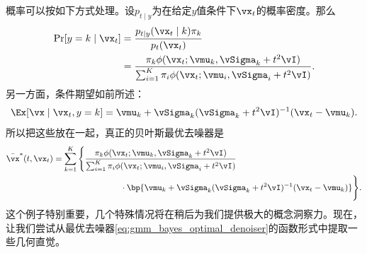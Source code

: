 \documentclass[../../book-main_zh.tex]{subfiles}
\begin{document}
\begin{example}[从高斯混合中去除高斯噪声]
    概率可以按如下方式处理。设\(p_{t \mid y}\)为在给定\(y\)值条件下\(\vx_{t}\)的概率密度。那么
    \begin{align}
        \Pr[y = k \mid \vx_{t}]
        &= \frac{p_{t \mid y}(\vx_{t} \mid k)\pi_{k}}{p_{t}(\vx_{t})} \\
        &= \frac{\pi_{k}\phi(\vx_{t} ; \vmu_{k}, \vSigma_{k}
        + t^{2}\vI)}{\sum_{i = 1}^{K}\pi_{i}\phi(\vx_{t} ; \vmu_{i},
        \vSigma_{i} + t^{2}\vI)}.
    \end{align}
    另一方面，条件期望如前所述：
    \begin{equation}
        \Ex[\vx \mid \vx_{t}, y = k] = \vmu_{k} +
        \vSigma_{k}(\vSigma_{k} + t^{2}\vI)^{-1}(\vx_{t} - \vmu_{k}).
    \end{equation}
    所以把这些放在一起，真正的贝叶斯最优去噪器是
    \begin{align}\label{eq:gmm_bayes_optimal_denoiser}
        \bar{\vx}^{\ast}(t, \vx_{t}) &= \sum_{k =
        1}^{K}\Bigg\{\frac{\pi_{k}\phi(\vx_{t}
            ;\vmu_{k}, \vSigma_{k} + t^{2}\vI)}{\sum_{i =
                1}^{K}\pi_{i}\phi(\vx_{t}
            ;\vmu_{i}, \vSigma_{i} + t^{2}\vI)}\\
            &\qquad \qquad \qquad \qquad   \cdot \bp{\vmu_{k} +
        \vSigma_{k}(\vSigma_{k} + t^{2}\vI)^{-1}(\vx_{t} - \vmu_{k})}\Bigg\}.
    \end{align}
    这个例子特别重要，几个特殊情况将在稍后为我们提供极大的概念洞察力。现在，让我们尝试从最优去噪器\eqref{eq:gmm_bayes_optimal_denoiser}的函数形式中提取一些几何直觉。


\end{example}
\end{document}
